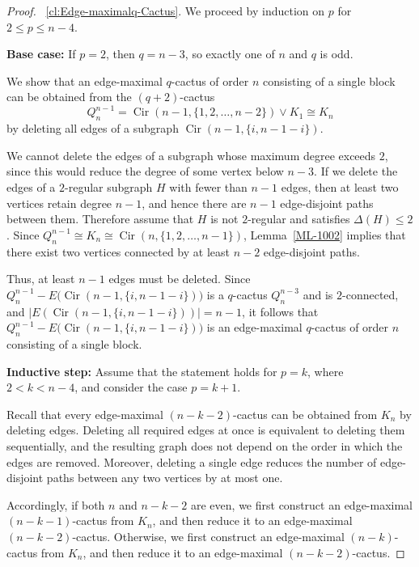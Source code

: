 \documentclass{article}
\begin{document}
\begin{proof}
~\ref{cl:Edge-maximalq-Cactus}. We proceed by induction on \(p\) for \(2\le p\le n-4\).

{\bf Base case:} If \(p=2\), then \(q=n-3\), so exactly one of \(n\) and \(q\) is odd.

We show that an edge-maximal \(q\)-cactus of order \(n\) consisting of a single block can be obtained from the \((q+2)\)-cactus
\[
Q_n^{n-1}=\operatorname{Cir}(n-1,\{1,2,\ldots,n-2\})\vee K_1\cong K_n
\]
by deleting all edges of a subgraph \(\operatorname{Cir}(n-1,\{i,n-1-i\})\).

We cannot delete the edges of a subgraph whose maximum degree exceeds \(2\), since this would reduce the degree of some vertex below \(n-3\). If we delete the edges of a \(2\)-regular subgraph \(H\) with fewer than \(n-1\) edges, then at least two vertices retain degree \(n-1\), and hence there are \(n-1\) edge-disjoint paths between them. Therefore assume that \(H\) is not \(2\)-regular and satisfies \(\Delta(H)\le 2\). Since \(Q_n^{n-1}\cong K_n \cong \operatorname{Cir}(n,\{1,2,\ldots,n-1\})\), Lemma~\ref{ML-1002} implies that there exist two vertices connected by at least \(n-2\) edge-disjoint paths.

Thus, at least \(n-1\) edges must be deleted. Since \(Q_n^{n-1}-E\bigl(\operatorname{Cir}(n-1,\{i,n-1-i\})\bigr)\) is a \(q\)-cactus $Q_n^{n-3}$ and is \(2\)-connected, and \(\bigl|E(\operatorname{Cir}(n-1,\{i,n-1-i\}))\bigr|=n-1\), it follows that \(Q_n^{n-1}-E\bigl(\operatorname{Cir}(n-1,\{i,n-1-i\})\bigr)\) is an edge-maximal \(q\)-cactus of order \(n\) consisting of a single block.

{\bf Inductive step:} Assume that the statement holds for \(p=k\), where \(2<k<n-4\), and consider the case \(p=k+1\).

Recall that every edge-maximal \((n-k-2)\)-cactus can be obtained from \(K_n\) by deleting edges. Deleting all required edges at once is equivalent to deleting them sequentially, and the resulting graph does not depend on the order in which the edges are removed. Moreover, deleting a single edge reduces the number of edge-disjoint paths between any two vertices by at most one.

Accordingly, if both \(n\) and \(n-k-2\) are even, we first construct an edge-maximal \((n-k-1)\)-cactus from \(K_n\), and then reduce it to an edge-maximal \((n-k-2)\)-cactus. Otherwise, we first construct an edge-maximal \((n-k)\)-cactus from \(K_n\), and then reduce it to an edge-maximal \((n-k-2)\)-cactus.


\end{proof}
\end{document}
